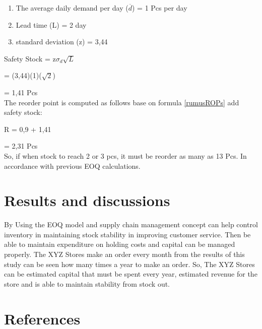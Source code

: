 \documentclass[12pt,a4paper,final]{iopart}
\begin{document}
\begin{enumerate}[label=(\alph*)]
	\item The average daily demand per day ($\overline{d}$) = 1 Pcs per day
	\item Lead time (L) = 2 day
	\item standard deviation (z) = 3,44
\end{enumerate}

Safety Stock = z$\sigma_d\sqrt{L}$

= (3,44)(1)($\sqrt{2}$)

= 1,41 Pcs\\
The reorder point is computed as follows base on formula \ref{rumusROPs} add safety stock:

R = 0,9 + 1,41

= 2,31 Pcs\\
So, if when stock to reach 2 or 3 pcs, it must be reorder as many as 13 Pcs. In accordance with previous EOQ calculations.


\section{Results and discussions}

By Using the EOQ model and supply chain management concept can help control inventory in maintaining stock stability in improving customer service. Then be able to maintain expenditure on holding costs and capital can be managed properly. The XYZ Stores make an order every month from the results of this study can be seen how many times a year to make an order. So, The XYZ Stores can be estimated capital that must be spent every year, estimated revenue for the store and is able to maintain stability from stock out.


\section*{References}




\end{document}
